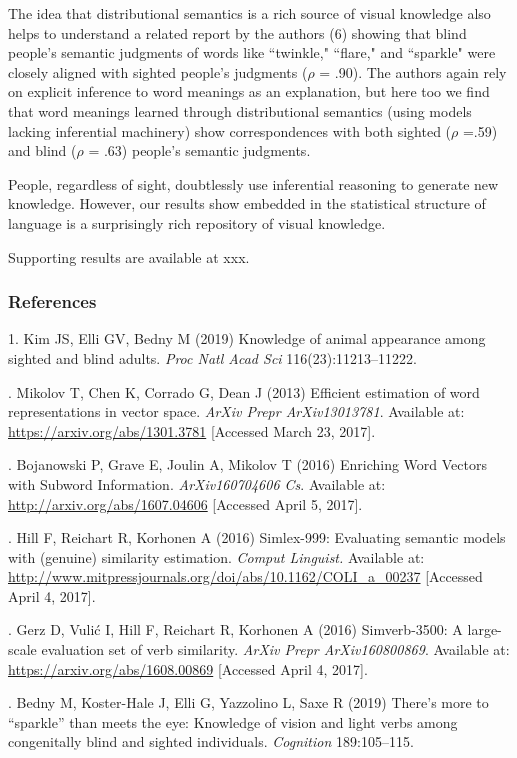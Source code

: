 \documentclass[12pt]{article}
\begin{document}
The idea that distributional semantics is a rich source of visual knowledge also helps to understand a related report by the authors (6) showing that blind people's semantic judgments of words like ``twinkle," ``flare," and ``sparkle" were closely aligned with sighted people’s judgments ($\rho$ = .90). The authors again rely on explicit inference to word meanings as an explanation, but here too we find that word meanings learned through distributional semantics (using models lacking inferential machinery) show correspondences with both sighted ($\rho$ =.59) and blind ($\rho$ = .63) people's semantic judgments. 

People, regardless of sight, doubtlessly use inferential reasoning to generate new knowledge. However, our results show embedded in the statistical structure of language is a surprisingly rich repository of visual knowledge.

Supporting results are available at xxx.


\subsubsection*{References}

1. 	Kim JS, Elli GV, Bedny M (2019) Knowledge of animal appearance among sighted and blind adults. {\it Proc Natl Acad Sci} 116(23):11213–11222.
\vspace{3mm}

. 	Mikolov T, Chen K, Corrado G, Dean J (2013) Efficient estimation of word representations in vector space. {\it ArXiv Prepr ArXiv13013781}. Available at: \url{https://arxiv.org/abs/1301.3781} [Accessed March 23, 2017].
\vspace{3mm}

. 	Bojanowski P, Grave E, Joulin A, Mikolov T (2016) Enriching Word Vectors with Subword Information. {\it ArXiv160704606 Cs}. Available at: \url{http://arxiv.org/abs/1607.04606} [Accessed April 5, 2017].
\vspace{3mm}

. 	Hill F, Reichart R, Korhonen A (2016) Simlex-999: Evaluating semantic models with (genuine) similarity estimation.  {\it Comput Linguist.} Available at: \url{http://www.mitpressjournals.org/doi/abs/10.1162/COLI_a_00237} [Accessed April 4, 2017].
\vspace{3mm}

. 	Gerz D, Vulić I, Hill F, Reichart R, Korhonen A (2016) Simverb-3500: A large-scale evaluation set of verb similarity.  {\it ArXiv Prepr ArXiv160800869}. Available at: \url{https://arxiv.org/abs/1608.00869} [Accessed April 4, 2017].
\vspace{3mm}

. 	Bedny M, Koster-Hale J, Elli G, Yazzolino L, Saxe R (2019) There’s more to “sparkle” than meets the eye: Knowledge of vision and light verbs among congenitally blind and sighted individuals.  {\it Cognition} 189:105–115.
\end{document}
